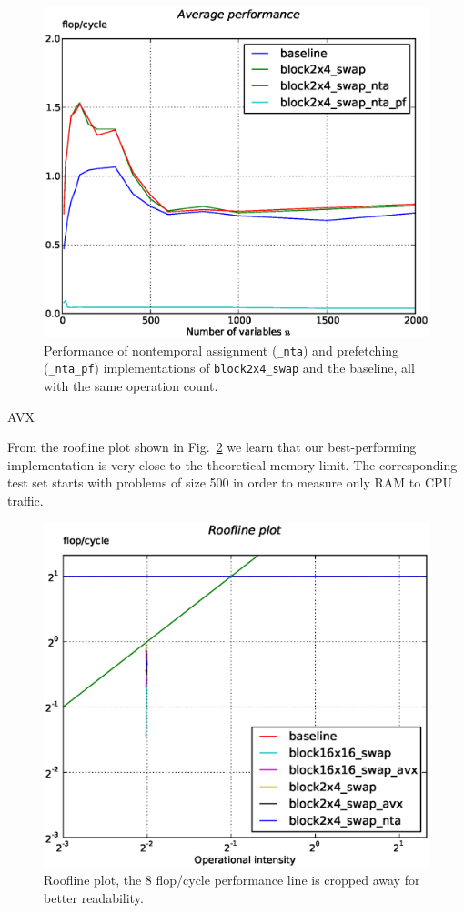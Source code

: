 \documentclass[letterpaper]{article}
\begin{document}
\begin{figure}\centering
  \includegraphics[scale=0.4]{img/results_cachecontrol_novec.eps}
  \caption{Performance of nontemporal assignment ({\tt \_nta}) and prefetching ({\tt \_nta\_pf}) implementations of {\tt block2x4\_swap} and the baseline,
  all with the same operation count.\label{res_cachecontrol}}
\end{figure}


AVX

From the roofline plot shown in Fig.~\ref{res_roof_high} we learn that our best-performing implementation is very close to the theoretical memory limit.
The corresponding test set starts with problems of size 500 in order to measure only RAM to CPU traffic.

\begin{figure}\centering
  \includegraphics[scale=0.4]{img/roof_high_autovec.eps}
  \caption{Roofline plot, the 8 flop/cycle performance line is cropped away for better readability.\label{res_roof_high}}
\end{figure}
\end{document}
